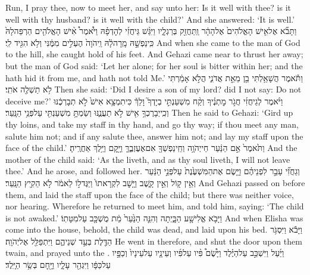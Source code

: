 {Run, I pray thee, now to meet her, and say unto her: Is it well with thee? is it well with thy husband? is it well with the child?’ And she answered: ‘It is well.’}
{וַתָּבֹ֞א אֶל\maqqaf אִ֤ישׁ הָאֱלֹהִים֙ אֶל\maqqaf הָהָ֔ר וַֽתַּחֲזֵ֖ק בְּרַגְלָ֑יו וַיִּגַּ֨שׁ גֵּיחֲזִ֜י לְהׇדְפָ֗הּ וַיֹּ֩אמֶר֩ אִ֨ישׁ הָאֱלֹהִ֤ים הַרְפֵּה\maqqaf לָהּ֙ כִּֽי\maqqaf נַפְשָׁ֣הּ מָֽרָה\maqqaf לָ֔הּ וַֽיהֹוָה֙ הֶעְלִ֣ים מִמֶּ֔נִּי וְלֹ֥א הִגִּ֖יד לִֽי׃}
{And when she came to the man of God to the hill, she caught hold of his feet. And Gehazi came near to thrust her away; but the man of God said: ‘Let her alone; for her soul is bitter within her; and the \lord\space hath hid it from me, and hath not told Me.’}
{וַתֹּ֕אמֶר הֲשָׁאַ֥לְתִּי בֵ֖ן מֵאֵ֣ת אֲדֹנִ֑י הֲלֹ֣א אָמַ֔רְתִּי לֹ֥א תַשְׁלֶ֖ה אֹתִֽי׃}
{Then she said: ‘Did I desire a son of my lord? did I not say: Do not deceive me?’}
{וַיֹּ֨אמֶר לְגֵיחֲזִ֜י חֲגֹ֣ר מׇתְנֶ֗יךָ וְקַ֨ח מִשְׁעַנְתִּ֣י בְיָדְךָ֮ וָלֵךְ֒ כִּי\maqqaf תִמְצָ֥א אִישׁ֙ לֹ֣א תְבָרְכֶ֔נּוּ וְכִֽי\maqqaf יְבָרֶכְךָ֥ אִ֖ישׁ לֹ֣א תַעֲנֶ֑נּוּ וְשַׂמְתָּ֥ מִשְׁעַנְתִּ֖י עַל\maqqaf פְּנֵ֥י הַנָּֽעַר׃}
{Then he said to Gehazi: ‘Gird up thy loins, and take my staff in thy hand, and go thy way; if thou meet any man, salute him not; and if any salute thee, answer him not; and lay my staff upon the face of the child.’}
{וַתֹּ֙אמֶר֙ אֵ֣ם הַנַּ֔עַר חַי\maqqaf יְהֹוָ֥ה וְחֵֽי\maqqaf נַפְשְׁךָ֖ אִם\maqqaf אֶעֶזְבֶ֑ךָּ וַיָּ֖קׇם וַיֵּ֥לֶךְ אַחֲרֶֽיהָ׃}
{And the mother of the child said: ‘As the \lord\space liveth, and as thy soul liveth, I will not leave thee.’ And he arose, and followed her.}
{וְגֵחֲזִ֞י עָבַ֣ר לִפְנֵיהֶ֗ם וַיָּ֤שֶׂם אֶת\maqqaf הַמִּשְׁעֶ֙נֶת֙ עַל\maqqaf פְּנֵ֣י הַנַּ֔עַר וְאֵ֥ין ק֖וֹל וְאֵ֣ין קָ֑שֶׁב וַיָּ֤שׇׁב לִקְרָאתוֹ֙ וַיַּגֶּד\maqqaf ל֣וֹ לֵאמֹ֔ר לֹ֥א הֵקִ֖יץ הַנָּֽעַר׃}
{And Gehazi passed on before them, and laid the staff upon the face of the child; but there was neither voice, nor hearing. Wherefore he returned to meet him, and told him, saying: ‘The child is not awaked.’}
{וַיָּבֹ֥א אֱלִישָׁ֖ע הַבָּ֑יְתָה וְהִנֵּ֤ה הַנַּ֙עַר֙ מֵ֔ת מֻשְׁכָּ֖ב עַל\maqqaf מִטָּתֽוֹ׃}
{And when Elisha was come into the house, behold, the child was dead, and laid upon his bed.}
{וַיָּבֹ֕א וַיִּסְגֹּ֥ר הַדֶּ֖לֶת בְּעַ֣ד שְׁנֵיהֶ֑ם וַיִּתְפַּלֵּ֖ל אֶל\maqqaf יְהֹוָֽה׃}
{He went in therefore, and shut the door upon them twain, and prayed unto the \lord.}
{וַיַּ֜עַל וַיִּשְׁכַּ֣ב עַל\maqqaf הַיֶּ֗לֶד וַיָּ֩שֶׂם֩ פִּ֨יו עַל\maqqaf פִּ֜יו וְעֵינָ֤יו עַל\maqqaf עֵינָיו֙ וְכַפָּ֣יו עַל\maqqaf כַּפָּ֔ו וַיִּגְהַ֖ר עָלָ֑יו וַיָּ֖חׇם בְּשַׂ֥ר הַיָּֽלֶד׃}
